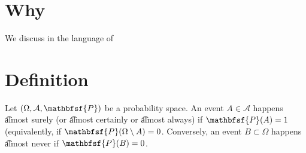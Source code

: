 

\section*{Why}

We discuss in the language of 

\section*{Definition}

Let $(\Omega , \mathcal{A} , \mathbfsf{P} )$ be a probability space.
An event $A \in \mathcal{A} $ happens \t{almost surely} (or \t{almost certainly} or \t{almost always}) if $\mathbfsf{P} (A) = 1$ (equivalently, if $\mathbfsf{P} (\Omega  \setminus A) = 0$.
Conversely, an event $B \subset \Omega $ happens \t{almost never} if $\mathbfsf{P} (B) = 0$.

\blankpage
